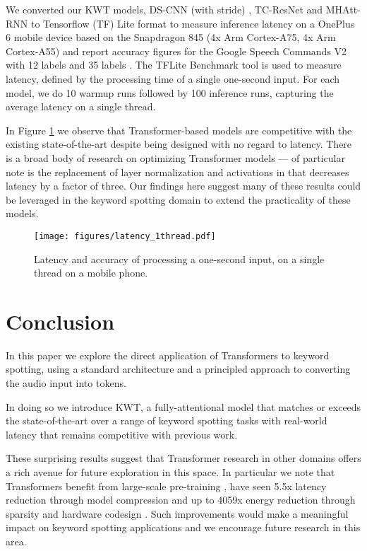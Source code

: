 \documentclass[a4paper]{article}
\begin{document}
We converted our KWT models, DS-CNN (with stride) \cite{zhang2017hello}, TC-ResNet \cite{choi2019temporal} and MHAtt-RNN \cite{rybakov2020streaming} to Tensorflow (TF) Lite format to measure inference latency on a OnePlus 6 mobile device based on the Snapdragon 845 (4x Arm Cortex-A75, 4x Arm Cortex-A55) and report accuracy figures for the Google Speech Commands V2 with 12 labels and 35 labels \cite{speechv2,rybakov2020streaming}. The TFLite Benchmark tool \cite{TFLite_benchmark} is used to measure latency, defined by the processing time of a single one-second input. For each model, we do 10 warmup runs followed by 100 inference runs, capturing the average latency on a single thread.

In Figure \ref{fig:latency} we observe that Transformer-based models are competitive with the existing state-of-the-art despite being designed with no regard to latency. There is a broad body of research on optimizing Transformer models --- of particular note is the replacement of layer normalization and activations in \cite{sun2020mobilebert} that decreases latency by a factor of three. Our findings here suggest  many of these results could be leveraged in the keyword spotting domain to extend the practicality of these models.

\begin{figure}[t]
    \centering
    \texttt{[image: figures/latency\_1thread.pdf]}
    \caption{Latency and accuracy of processing a one-second input, on a single thread on a mobile phone.}
    \label{fig:latency}
  \end{figure}

\section{Conclusion}
In this paper we explore the direct application of Transformers to keyword spotting, using a standard architecture and a principled approach to converting the audio input into tokens.

In doing so we introduce KWT, a fully-attentional model that matches or exceeds the state-of-the-art over a range of keyword spotting tasks with real-world latency that remains competitive with previous work.

These surprising results suggest that Transformer research in other domains offers a rich avenue for future exploration in this space. In particular we note that Transformers benefit from large-scale pre-training \cite{dosovitskiy2020image}, have seen 5.5x latency reduction through model compression \cite{sun2020mobilebert} and up to 4059x energy reduction through sparsity and hardware codesign \cite{wang2021spatten}. Such improvements would make a meaningful impact on keyword spotting applications and we encourage future research in this area.
\end{document}

